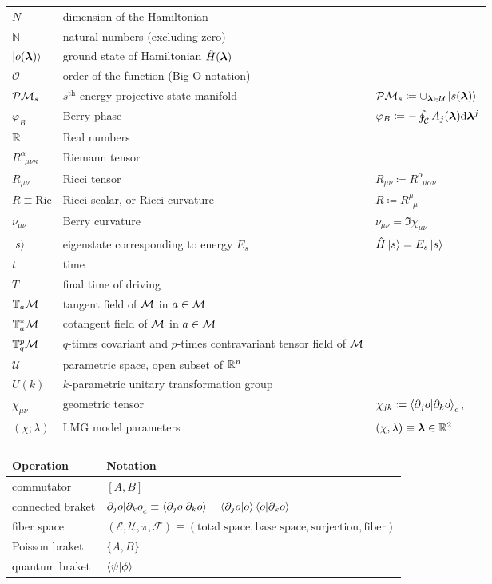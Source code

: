 \begin{tabular} {@{}C{1.9cm}@{}p{8cm}@{}C{3.77cm}}
	  $N$ & dimension of the Hamiltonian & \\
	  $\mathbb{N}$ & natural numbers (excluding zero) \\
	  $\ket{o({\bm\lambda})}$& ground state of Hamiltonian $\hat{H}({\bm\lambda})$  &  \\
	  $\mathcal O$& order of the function (Big O notation)  &  \\
	  $\mathcal{P}\mathcal{M}_s$& $s^{\text{th}}$ energy projective state manifold & $\mathcal{P}\mathcal{M}_s\coloneqq\cup_{{\bm\lambda}\in\mathcal U} \ket{s({\bm\lambda})}$ \\
	  $\varphi_B$ & Berry phase & $\varphi_B\coloneqq-\oint_\mathcal{C} A_j({\bm\lambda})\mathrm{d} {\bm\lambda}^j$\\
	  $\mathbb{R}$& Real numbers  &  \\
	  $R^\alpha_{\;\;\mu\nu\kappa}$ &Riemann tensor & \\
	  $R_{\mu\nu}$ & Ricci tensor & $R_{\mu\nu}\coloneqq R^\alpha_{\;\;\mu\alpha\nu}$\\
	  $R\equiv \mathrm{Ric}$ & Ricci scalar, or Ricci curvature & $R\coloneqq R^\mu_{\;\;\mu}$\\
	  $\nu_{\mu\nu}$ & Berry curvature & $\nu_{\mu\nu}= \Im\chi_{\mu\nu}$ \\ 
	  $\ket{s}$& eigenstate corresponding to energy $E_s$& $\hat{H}\ket{s}=E_s\ket{s}$ \\
	  $t$& time  &  \\
	  $T$& final time of driving  &  \\
	  $\mathbb T_a \mathcal{M}$& tangent field of $\mathcal{M}$ in $a\in \mathcal{M}$ &  \\
	  $\mathbb T_a^* \mathcal{M}$& cotangent field of $\mathcal{M}$ in $a\in \mathcal{M}$ &  \\
	  $\mathbb{T}^p_q\mathcal{M}$& $q$-times covariant and $p$-times contravariant tensor field of $\mathcal{M}$&  \\
	  $\mathcal U$& parametric space, open subset of $\mathbb{R}^n$  & \\
	  $U(k)$& $k$-parametric unitary transformation group  &  \\
	  $\chi_{\mu\nu}$ & geometric tensor & $\chi_{jk}\coloneqq \braket{\partial_j o|\partial_k o}_c,
	  $ \\
	  $(\chi;\lambda)$& LMG model parameters  & $(\chi,\lambda)\equiv {\bm\lambda}\in\mathbb{R}^2$ \\
\bottomrule
{}
\end{tabular}


	  \begin{tabular} {@{}C{4cm}@{}p{9.67cm}}
	\toprule
	\textbf{Operation}& \textbf{Notation}\\\bottomrule	
	commutator & $[A,B]$ \\
	connected braket & ${\partial_j o|\partial_k o}_c \equiv \braket{\partial_j o|\partial_k o} - \braket{\partial_j o|o}\braket{o|\partial_k o}$\\
	fiber space & $(\mathcal{E},\mathcal{U},\pi,\mathcal{F})\equiv(\text{total space},\text{base space}, \text{surjection},\text{fiber})$\\
	Poisson braket & $\{A,B\}$ \\
	quantum braket & $\braket{\psi|\phi}$\\
	\bottomrule
\end{tabular}


